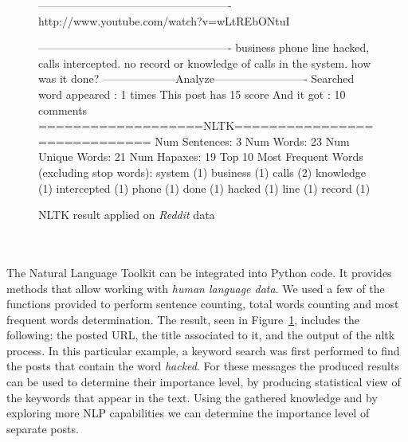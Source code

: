 \documentclass[12pt]{article}
\begin{document}
\begin{figure}[h]
\begin{footnotesize}
\begin{spverbatim}
----------------------------------------------------
http://www.youtube.com/watch?v=wLtREbONtuI 

----------------------------------------------------
business phone line hacked, calls intercepted. no record or
knowledge of calls in the system. how was it done?
--------------------Analyze-------------------------
Searched word appeared :  1  times
This post has  15  score
And it got  :  10  comments
===================NLTK=============================
	Num Sentences:           3
	Num Words:               23
	Num Unique Words:        21
	Num Hapaxes:             19
	Top 10 Most Frequent Words (excluding stop words):
		system (1)
		business (1)
		calls (2)
		knowledge (1)
		intercepted (1)
		phone (1)
		done (1)
		hacked (1)
		line (1)
		record (1)
\end{spverbatim}
\end{footnotesize}
\captionsetup{font=small}
\caption{NLTK result applied on \textit{Reddit} data}
\label{fig:nltk}
\end{figure}
\hfill \break
\\
\\
The Natural Language Toolkit \cite{nltk} can be integrated into Python code. It provides methods that allow working with \textit{human language data}. We used a few of the functions provided to perform sentence counting, total words counting and most frequent words determination.  The result, seen in Figure~\ref{fig:nltk}, includes the following: the posted URL, the title associated to it, and the output of the nltk process. In this particular example, a keyword search was first performed to find the posts that contain the word \textit{hacked}. For these messages the produced results can be used to determine their importance level, by producing statistical view of the keywords that appear in the text. Using the gathered knowledge and by exploring more NLP capabilities we can determine the importance level of separate posts.
\end{document}
